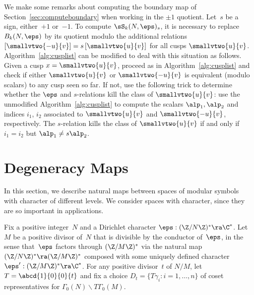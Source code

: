\begin{remark}
We make some remarks about computing
the boundary map of Section~\ref{sec:computeboundary} when working
in the $\pm 1$ quotient.
Let~$s$ be a sign, either~$+1$
or~$-1$.  To compute $\sS_k(N,\eps)_s$, it is necessary to replace
$B_k(N,\eps)$ by its quotient modulo the additional relations $\left[
  \smallvtwo{-u}{\hfill v}\right] = s \left[\smallvtwo{u}{v}\right]$
for all cusps $\smallvtwo{u}{v}$.  Algorithm~\ref{alg:cusplist} can be
modified to deal with this situation as follows.  Given a cusp
$x=\smallvtwo{u}{v}$, proceed as in Algorithm~\ref{alg:cusplist} and
check if either $\smallvtwo{u}{v}$ or $\smallvtwo{-u}{\hfill v}$ is
equivalent (modulo scalars) to any cusp seen so far.  If not, use the
following trick to determine whether the $\eps$ and $s$-relations kill
the class of $\smallvtwo{u}{v}$: use the unmodified
Algorithm~\ref{alg:cusplist} to compute the scalars $\alp_1, \alp_2$
and indices $i_1$, $i_2$ associated to $\smallvtwo{u}{v}$ and
$\smallvtwo{-u}{\hfill v}$, respectively.  The $s$-relation kills the
class of $\smallvtwo{u}{v}$ if and only if $i_1=i_2$ but $\alp_1\neq
s\alp_2$.
\end{remark}


\section{Degeneracy Maps}\label{sec:degen}
In this section, we describe natural maps between spaces of
modular symbols with character of different levels. 
We consider spaces with character, since
they are so important in applications. 

Fix a positive integer~$N$ and a Dirichlet 
character 
$\eps : (\Z/N\Z)^*\ra \C^*$.  Let~$M$ be a positive divisor
of~$N$ that is divisible by the conductor of~$\eps$, in the sense
that~$\eps$ factors through $(\Z/M\Z)^*$ via the natural map
$(\Z/N\Z)^*\ra (\Z/M\Z)^*$ composed with some uniquely defined
character $\eps':(\Z/M\Z)^*\ra\C^*$.  For any positive divisor~$t$ of
$N/M$, let $T=\abcd{1}{0}{0}{t}$ and fix a choice $D_t=\{T\gamma_i :
i=1,\ldots, n\}$ of coset representatives for $\Gamma_0(N)\backslash
T\Gamma_0(M)$.

